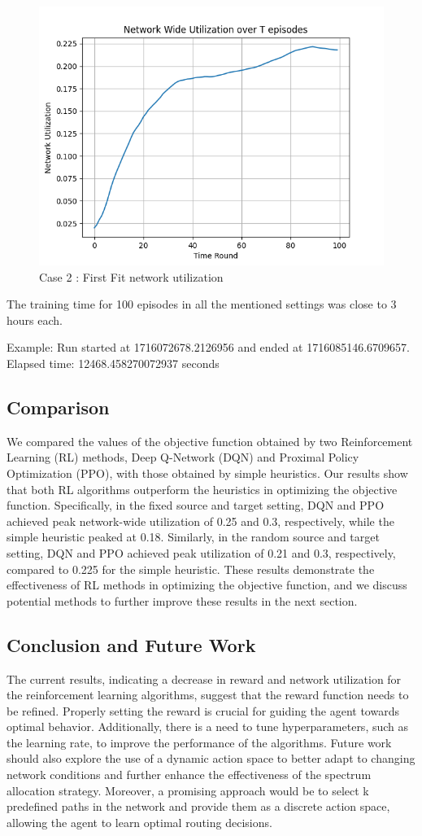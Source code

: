 \documentclass[conference]{IEEEtran}
\begin{document}
\begin{figure}[H]
    \centering
    \includegraphics[width=0.5\linewidth]{FirstFit_ut2.png}
    \caption{Case 2 : First Fit network utilization}
    \label{fig:enter-label}
\end{figure}

The training time for 100 episodes in all the mentioned settings was close to 3 hours each.

Example: Run started at 1716072678.2126956 and ended at 1716085146.6709657. Elapsed time: 12468.458270072937 seconds

\subsection{\textbf{Comparison}}
We compared the values of the objective function obtained by two Reinforcement Learning (RL) methods, Deep Q-Network (DQN) and Proximal Policy Optimization (PPO), with those obtained by simple heuristics. Our results show that both RL algorithms outperform the heuristics in optimizing the objective function. Specifically, in the fixed source and target setting, DQN and PPO achieved peak network-wide utilization of 0.25 and 0.3, respectively, while the simple heuristic peaked at 0.18. Similarly, in the random source and target setting, DQN and PPO achieved peak utilization of 0.21 and 0.3, respectively, compared to 0.225 for the simple heuristic. These results demonstrate the effectiveness of RL methods in optimizing the objective function, and we discuss potential methods to further improve these results in the next section.

\subsection{\textbf{Conclusion and Future Work}}
The current results, indicating a decrease in reward and network utilization for the reinforcement learning algorithms, suggest that the reward function needs to be refined. Properly setting the reward is crucial for guiding the agent towards optimal behavior. Additionally, there is a need to tune hyperparameters, such as the learning rate, to improve the performance of the algorithms. Future work should also explore the use of a dynamic action space to better adapt to changing network conditions and further enhance the effectiveness of the spectrum allocation strategy. Moreover, a promising approach would be to select k predefined paths in the network and provide them as a discrete action space, allowing the agent to learn optimal routing decisions. \cite{ZHANG2022108663}



\end{document}
